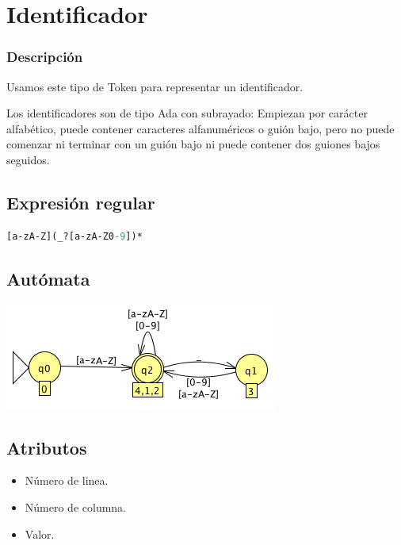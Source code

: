             \hfill
            \clearpage
            


	\section{Identificador}

        \subsubsection{Descripción}
        
            Usamos este tipo de Token para representar un identificador.
            
            Los identificadores son de tipo Ada con subrayado: Empiezan por carácter alfabético, puede contener caracteres alfanuméricos o guión bajo, pero no puede comenzar ni terminar con un guión bajo ni puede contener dos guiones bajos seguidos.
            
        \subsection{Expresión regular}

            \begin{lstlisting}[language=Perl]
[a-zA-Z](_?[a-zA-Z0-9])*
            \end{lstlisting}

        \subsection{Autómata}
        
            \includegraphics[scale=.7]{../Design/jflap/Identificador.png}

        \subsection{Atributos}
        
            \begin{itemize}
                \item Número de linea.
                \item Número de columna.
                \item Valor.
            \end{itemize}

